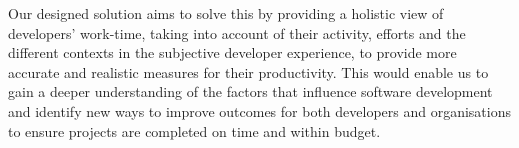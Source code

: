 \documentclass[../mpaper.tex]{subfiles}
\begin{document}
Our designed solution aims to solve this by providing a holistic view of developers' work-time, taking into account of their activity, efforts and the different contexts in the subjective developer experience, to provide more accurate and realistic measures for their productivity. This would enable us to gain a deeper understanding of the factors that influence software development and identify new ways to improve outcomes for both developers and organisations to ensure projects are completed on time and within budget.
\end{document}
